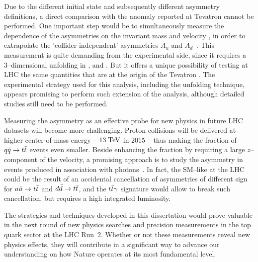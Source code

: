 Due to the different initial state and subsequently different
asymmetry definitions, a direct comparison with the anomaly reported
at Tevatron cannot be performed. One important step would be to
simultaneously measure the dependence of the asymmetries on the
\ttbar{} invariant mass \mtt{} and velocity \betatt{}, in order to
extrapolate the 'collider-independent' asymmetries $A_u$ and
$A_d$~\cite{AguilarSaavedra:2012va}. This measurement is quite
demanding from the experimental side, since it requires a
3--dimensional unfolding in \mtt{}, \betatt{} and \dy{}. But it offers
a unique possibility of testing at LHC the same quantities that are at
the origin of the Tevatron \afb{}.
The experimental strategy used for this analysis, including the
unfolding technique, appears promising to perform such extension of
the analysis, although detailed studies still need to be performed.

Measuring the asymmetry \ac{} as an effective probe for new physics in
future LHC datasets will become more challenging. Proton collisions
will be delivered at higher center-of-mass energy -- $13\; \mathrm{TeV}{}$ in
2015 -- thus making the fraction of $q\bar{q}{}\to t\bar{t}{}$ events even
smaller. Beside enhancing the \qqbar{} fraction by requiring a large
$z$--component of the \ttbar{} velocity, a promising approach is to
study the asymmetry in \ttbar{} events produced in association with
photons~\cite{Aguilar-Saavedra:2014vta}. 
In fact, the SM--like \ac{} at the LHC could be the result of an accidental
cancellation of asymmetries of different sign for $u\bar{u}\to t\bar{t}$
and $d\bar{d}\to t\bar{t}$, and the $t\bar{t}{}\gamma$ signature would allow
to break such cancellation, but requires a high integrated luminosity.

The strategies and techniques developed in this dissertation would prove
valuable in the next round of new physics searches and precision
measurements in the top quark sector at the LHC \mbox{Run 2}.
Whether or not these measurements reveal new physics effects, they
will contribute in a significant way to advance our understanding on
how Nature operates at its most fundamental level.